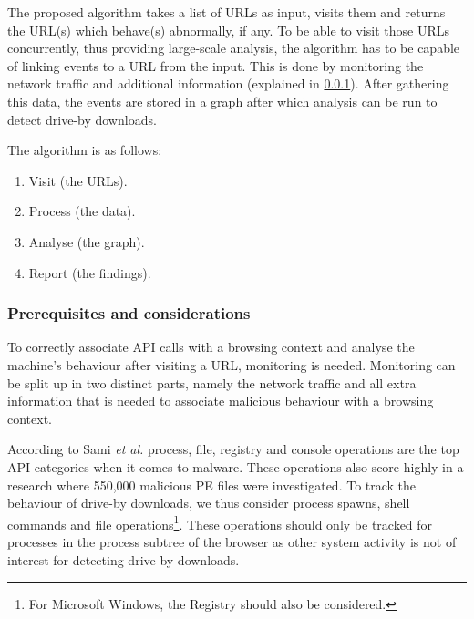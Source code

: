 The proposed algorithm takes a list of URLs as input, visits them and returns the URL(s) which behave(s) abnormally, if any. To be able to visit those URLs concurrently, thus providing large-scale analysis, the algorithm has to be capable of linking events to a URL from the input. This is done by monitoring the network traffic and additional information (explained in \ref{sec:prereq}). After gathering this data, the events are stored in a graph after which analysis can be run to detect drive-by downloads.

The algorithm is as follows:

\begin{changemargin}{5cm}{0cm}
\begin{enumerate}
\item Visit (the URLs).
\item Process (the data).
\item Analyse (the graph).
\item Report (the findings).
\end{enumerate}
\end{changemargin}

\subsubsection{Prerequisites and considerations}
\label{sec:prereq}

To correctly associate API calls with a browsing context and analyse the machine's behaviour after visiting a URL, monitoring is needed. Monitoring can be split up in two distinct parts, namely the network traffic and all extra information that is needed to associate malicious behaviour with a browsing context.

According to Sami \textit{et al.} \cite{Sami:2010:MDB:1774088.1774303} process, file, registry and console operations are the top API categories when it comes to malware. These operations also score highly in a research \cite{MaliciousAPIs} where 550,000 malicious PE files were investigated. To track the behaviour of drive-by downloads, we thus consider process spawns, shell commands and file operations\footnote{For Microsoft Windows, the Registry should also be considered.}. These operations should only be tracked for processes in the process subtree of the browser as other system activity is not of interest for detecting drive-by downloads.\\

